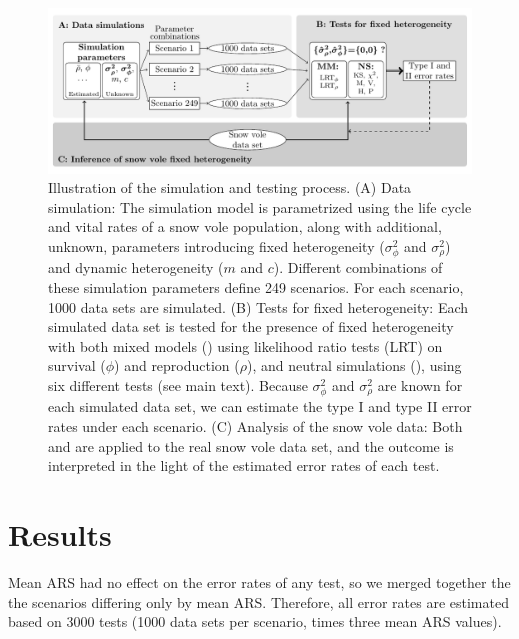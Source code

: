 \begin{figure}[H]
	\includegraphics[width= \textwidth]{FiguresDynHet/Figure1}
		\caption{\footnotesize Illustration of the simulation and testing process. (A) Data simulation: The simulation model is parametrized using the life cycle and vital rates of a snow vole population, along with additional, unknown, parameters introducing fixed heterogeneity ($\sigma_{\phi}^2$ and $\sigma_{\rho}^2$) and dynamic heterogeneity ($m$ and $c$). Different combinations of these simulation parameters define 249 scenarios. For each scenario, 1000 data sets are simulated. (B) Tests for fixed heterogeneity: Each simulated data set is tested for the presence of fixed heterogeneity with both mixed models (\MM) using likelihood ratio tests (LRT) on survival ($\phi$) and reproduction ($\rho$), and neutral simulations (\NSM), using six different tests (see main text). Because $\sigma_{\phi}^2$ and $\sigma_{\rho}^2$ are known for each simulated data set, we can estimate the type I and type II error rates under each scenario. (C) Analysis of the snow vole data: Both \MM and \NSM are applied to the real snow vole data set, and the outcome is interpreted in the light of the estimated error rates of each test.}
	\label{figure:flow}
\end{figure}
\section{Results}
Mean ARS had no effect on the error rates of any test, so we merged together the the scenarios differing only by mean ARS. Therefore, all error rates are estimated based on 3000 tests (1000 data sets per scenario, times three mean ARS values).

